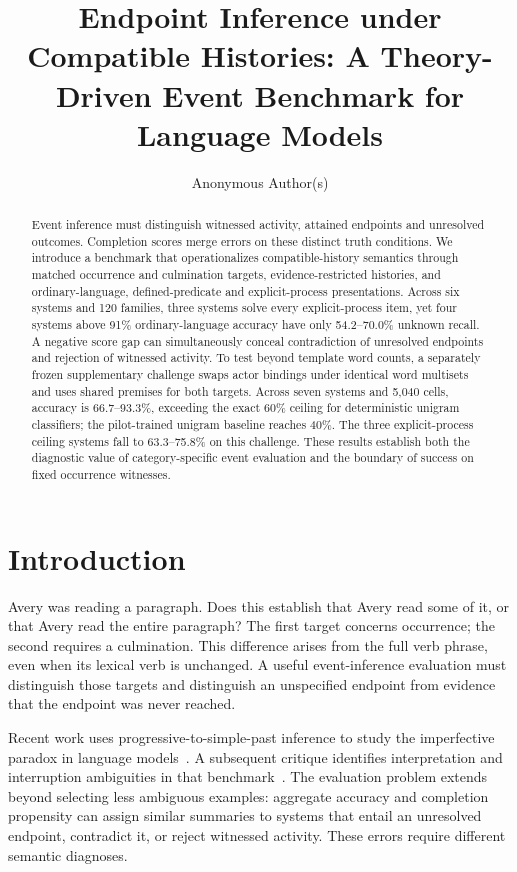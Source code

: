 \documentclass[sigconf,anonymous,review]{acmart}
\title[Endpoint Inference under Compatible Histories]{Endpoint Inference under Compatible Histories: A Theory-Driven Event Benchmark for Language Models}
\author{Anonymous Author(s)}
\begin{document}
\begin{abstract}
Event inference must distinguish witnessed activity, attained endpoints and unresolved outcomes. Completion scores merge errors on these distinct truth conditions. We introduce a benchmark that operationalizes compatible-history semantics through matched occurrence and culmination targets, evidence-restricted histories, and ordinary-language, defined-predicate and explicit-process presentations. Across six systems and 120 families, three systems solve every explicit-process item, yet four systems above 91\% ordinary-language accuracy have only 54.2--70.0\% unknown recall. A negative score gap can simultaneously conceal contradiction of unresolved endpoints and rejection of witnessed activity. To test beyond template word counts, a separately frozen supplementary challenge swaps actor bindings under identical word multisets and uses shared premises for both targets. Across seven systems and 5,040 cells, accuracy is 66.7--93.3\%, exceeding the exact 60\% ceiling for deterministic unigram classifiers; the pilot-trained unigram baseline reaches 40\%. The three explicit-process ceiling systems fall to 63.3--75.8\% on this challenge. These results establish both the diagnostic value of category-specific event evaluation and the boundary of success on fixed occurrence witnesses.

\end{abstract}
\maketitle
\section{Introduction}
Avery was reading a paragraph. Does this establish that Avery read some of it, or that Avery read the entire paragraph? The first target concerns occurrence; the second requires a culmination. This difference arises from the full verb phrase, even when its lexical verb is unchanged. A useful event-inference evaluation must distinguish those targets and distinguish an unspecified endpoint from evidence that the endpoint was never reached.

Recent work uses progressive-to-simple-past inference to study the imperfective paradox in language models~\cite{ma2026}. A subsequent critique identifies interpretation and interruption ambiguities in that benchmark~\cite{han2026}. The evaluation problem extends beyond selecting less ambiguous examples: aggregate accuracy and completion propensity can assign similar summaries to systems that entail an unresolved endpoint, contradict it, or reject witnessed activity. These errors require different semantic diagnoses.
\end{document}
